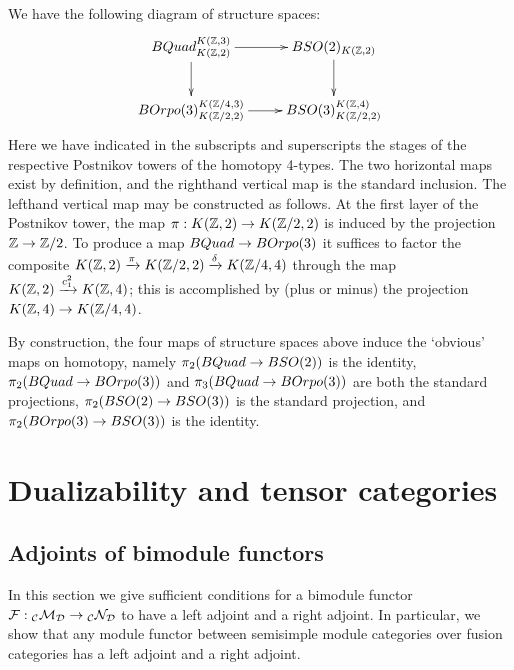 \documentclass{amsart}
\begin{document}
We have the following diagram of structure spaces:
\begin{equation} \nn
\xymatrix{
BQuad_{K(\ZZ,2)}^{K(\ZZ,3)} \ar[r] \ar[d] & BSO(2)_{K(\ZZ,2)} \ar[d] \\
BOrpo(3)_{K(\ZZ/2,2)}^{K(\ZZ/4,3)} \ar[r] & BSO(3)_{K(\ZZ/2,2)}^{K(\ZZ,4)}
}
\end{equation}
Here we have indicated in the subscripts and superscripts the stages of the respective Postnikov towers of the homotopy 4-types.  The two horizontal maps exist by definition, and the righthand vertical map is the standard inclusion.  The lefthand vertical map may be constructed as follows.  At the first layer of the Postnikov tower, the map $\pi: K(\mathbb Z,2) \rightarrow K(\mathbb Z/2,2)$ is induced by the projection $\mathbb Z \rightarrow \mathbb Z/2$.  To produce a map $BQuad \rightarrow BOrpo(3)$ it suffices to factor the composite $K(\mathbb Z,2) \xrightarrow{\pi} K(\mathbb Z/2,2) \xrightarrow{\delta} K(\mathbb Z/4,4)$ through the map $K(\mathbb Z,2) \xrightarrow{c_1^2} K(\mathbb Z,4)$; this is accomplished by (plus or minus) the projection $K(\mathbb Z,4) \rightarrow K(\mathbb Z/4,4)$.  %

By construction, the four maps of structure spaces above induce the `obvious' maps on homotopy, namely $\pi_2(BQuad \rightarrow BSO(2))$ is the identity, $\pi_2(BQuad \rightarrow BOrpo(3))$ and $\pi_3(BQuad \rightarrow BOrpo(3))$ are both the standard projections, $\pi_2(BSO(2) \rightarrow BSO(3))$ is the standard projection, and $\pi_2(BOrpo(3) \rightarrow BSO(3))$ is the identity.  




\section{Dualizability and tensor categories} \label{sec-dualfusion}


\subsection{Adjoints of bimodule functors} \label{sec-df-functors}

In this section we give sufficient conditions for a bimodule functor $\mathcal F: {}_\mathcal C \mathcal M_\mathcal D \rightarrow {}_\mathcal C \mathcal N_\mathcal D$ to have a left adjoint and a right adjoint.  In particular, we show that any module functor between semisimple module categories over fusion categories has a left adjoint and a right adjoint.
\end{document}
